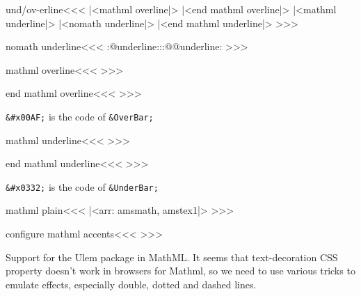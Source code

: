 {{{{{{\<und/ov-erline\><<<
   {\bgroup |<mathml overline|>}
   {|<end mathml overline|>\egroup}
   {\bgroup \ifmmode |<mathml underline|>\else 
     |<nomath underline|>\fi}
   {|<end mathml underline|>\egroup}
>>>

\<nomath underline\><<<
\expandafter\everymath
\expandafter{\expandafter\everymath
             \expandafter{\the\everymath}}%
\let\o::@underline:\o:@@underline:
\def\o:@@underline:{\let\o:@@underline:\o::@underline:}%
>>>











\<mathml overline\><<<
%
>>>

\<end mathml overline\><<<
%
>>>

\verb'&#x00AF;' is the code of \verb'&OverBar;'


\<mathml underline\><<<
% 
>>>

\<end mathml underline\><<<
%
>>>


\verb'&#x0332;' is the code of \verb'&UnderBar;'





\<mathml plain\><<<
|<arr: amsmath, amstex1|>
>>>



\<configure mathml accents\><<<
   {}
   {}
   {} 
   {}
   {}
   {} 
>>>

Support for the Ulem package in MathML. It seems that text-decoration CSS
property doesn't work in browsers for Mathml, so we need to use various tricks
to emulate effects, especially double, dotted and dashed lines. 

}}}}}}
